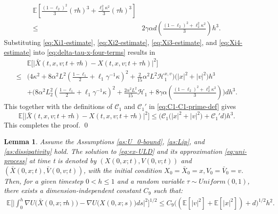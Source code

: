 \documentclass[12pt]{article}
\numberwithin{equation}{section}
\renewenvironment{proof}%
  {\begin{trivlist}%
   \item[]\ignorespaces}%
  {\qed\end{trivlist}}
\newtheorem{lem}{Lemma}[section]
\begin{document}
\begin{proof}
\begin{equation}
\begin{aligned}
\mathbb E
\left[
\tfrac{(1-\ell_2)^2}{3}
(\tau h)^3
+
\tfrac{\ell_2^2\kappa^2}{3}
(\tau h)^3
\right]
\\
\leq&
2\gamma\alpha d
\left(
\tfrac{(1-\ell_2)^2
+
\ell_2^2\kappa^2}{3}
\right)h^3.
\end{aligned}
\end{equation}
%
Substituting \eqref{eq:Xi1-estimate}, \eqref{eq:Xi2-estimate}, \eqref{eq:Xi3-estimate}, and \eqref{eq:Xi4-estimate} into \eqref{eq:delta-tau-x-four-terms} results in
\begin{equation}
\begin{aligned}
&
\mathbb E
\Big[
\big|
\bar X(t,x,v;t+\tau h)
-
X(t,x,v;t+\tau h)
\big|^2
\Big]
\\
\leq&
\Big(
4\kappa^2
+
8\alpha^2L^2
\left(
\tfrac{1-\ell_1}{2}
+
\ell_1\gamma^{-1}\kappa
\right)^2
+
\tfrac{2}{15}
\alpha^2L^2
\mathscr H^{x,v}_1
\Big)
\big(
|x|^2+|v|^2
\big)h^3
\\
&+
\Big(
8\alpha^2L_2^2
\left(
\tfrac{1-\ell_1}{2}
+
\ell_1\gamma^{-1}\kappa
\right)^2
+
\tfrac{2\alpha^2L^2}{15}
\mathscr H_1
+
8\gamma\alpha
\left(
\tfrac{(1-\ell_2)^2
+
\ell_2^2\kappa^2}{3}
\right)
\Big)
dh^3.
\end{aligned}
\end{equation}
This together with the definitions of \(\mathcal C_1\) and \(\mathcal C_1'\) in \eqref{eq:C1-C1-prime-def} gives
\[
\mathbb{E}
\Big[
\big|
\bar{X}(t,x,v;t+\tau h)
-
X(t,x,v;t+\tau h)
\big|^2
\Big]
\leq
\Big(
\mathcal C_1
\big(
|x|^2+|v|^2
\big)
+
\mathcal C_1'd
\Big)h^3.
\]
This completes the proof.
\end{proof}






\iffalse
\begin{lem}\label{nabla_x-nabla_bar}
    Assume the Assumptions \ref{as:U_0-bound}, \ref{as:Lip}, and \ref{as:dissipativity} hold. The solution to \eqref{eq:ex-ULD} and its approximation \eqref{eq:uni-process} at time t is denoted by $(X(0,x;t), V(0,v;t))$ and  $(\bar{X}(0,x;t), \bar{V}(0,v;t))$, with the initial condition $X_0=\bar{X}_0=x, V_0=\bar{V}_0=v$. Then, for a given timestep $0<h\leq 1$ and a random variable $\tau \sim Uniform(0,1)$, there exists a dimension-independent constant $C_{9}$ such that:
    \begin{align}
        \mathbb{E}\Big[\Big|\int^h_0\nabla U\big(\bar{X}(0,x;\tau h)\big)-\nabla U\big(X(0,x;s)\big)ds\Big|^2\Big]^{1/2}\leq C_{9}\big((\mathbb{E}[|v|^2]+\mathbb{E}[|x|^2])+d\big)^{1/2}h^2.
    \end{align}
\end{lem}
\end{document}
